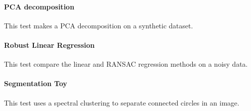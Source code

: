 \documentclass[11pt]{article}
\begin{document}

\paragraph{PCA decomposition}

This test makes a PCA decomposition on a synthetic dataset.


\paragraph{Robust Linear Regression}

This test compare the linear and  RANSAC regression methods on a noisy data.



\paragraph{Segmentation Toy}

This test uses a spectral clustering to separate connected circles in an image.




\end{document}
